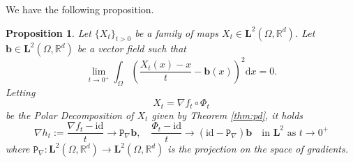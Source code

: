 \documentclass[11pt, twoside, reqno]{amsart}
\theoremstyle{definition} \newtheorem{definition}{Definition}[section]
\theoremstyle{definition} \newtheorem{remark}[definition]{Remark}
\theoremstyle{plain} \newtheorem{lemma}[definition]{Lemma}
\theoremstyle{plain} \newtheorem{proposition}[definition]{Proposition}
\theoremstyle{plain} \newtheorem{theorem}[definition]{Theorem}
\theoremstyle{plain} \newtheorem{corollary}[definition]{Corollary}
\theoremstyle{definition} \newtheorem{example}[definition]{Example}
\theoremstyle{plain} \newtheorem{claim}[clai]{Claim}
\theoremstyle{definition} \newtheorem{assumption}[definition]{Assumption}
\newcommand{\Id}{\mathrm{id}}
\newcommand{\1}{\mathbbm 1}
\renewcommand{\b}{\mathbf b}
\numberwithin{equation}{section} %
\theoremstyle{plain} \newtheorem*{theorem*}{Theorem}
\theoremstyle{plain} \newtheorem{mthm}[maintheorem]{Main Theorem}
\theoremstyle{plain} \newtheorem*{mthm*}{Main Theorem}
\theoremstyle{plain} \newtheorem*{conjecture*}{Conjecture}
\theoremstyle{plain} \newtheorem{conjecture}[definition]{Conjecture}
\theoremstyle{plain} \newtheorem*{problem*}{Problem}
\begin{document}
We have the following proposition.
\begin{proposition}\label{prop:convergencepolar}
    Let $\{X_t\}_{t > 0}$ be a family of maps $X_t \in \mathbf L^2(\Omega, \mathbb R^d)$. Let $\mathbf b \in \mathbf L^2(\Omega, \mathbb R^d)$ be a vector field such that 
    \begin{equation}\label{eq:assb}
    \lim_{t \to 0^+} \int_\Omega \left(\frac{X_t(x)-x}{t}- \mathbf b(x) \right)^2 \mathrm{d} x = 0.
    \end{equation}
    Letting
\begin{equation*}
X_t = \nabla {f_t} \circ \Phi_t
\end{equation*}
be the Polar Decomposition of $X_t$ given by Theorem \ref{thm:pd}, it holds
\begin{equation*}
\nabla h_t := \frac{\nabla {f_t} - \Id}{t} \to \mathtt P_\nabla \b, \quad \frac{\Phi_t - \Id}{t} \to (\Id - \mathtt P_\nabla) \b \quad \text{in $\mathbf L^2$ as $t \to 0^+$}
\end{equation*}
where $\mathtt P_\nabla : \mathbf L^2(\Omega, \mathbb R^d) \to \mathbf L^2(\Omega, \mathbb R^d)$ is the projection on the space of gradients.
\end{proposition}
\end{document}
